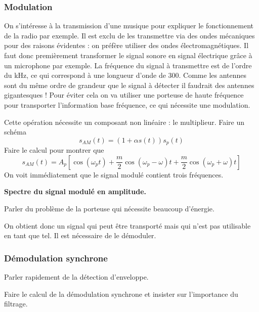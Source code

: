 \subsubsection{Modulation}

On s'intéresse à la transmission d'une musique pour expliquer le fonctionnement de la radio par exemple.
Il est exclu de les transmettre via des ondes mécaniques pour des raisons évidentes : on préfère utiliser des ondes électromagnétiques.
Il faut donc premièrement transformer le signal sonore en signal électrique grâce à un microphone par exemple.
La fréquence du signal à transmettre est de l'ordre du kHz, ce qui correspond à une longueur d'onde de \unit{300}{\kilo\meter}.
Comme les antennes sont du même ordre de grandeur que le signal à détecter il faudrait des antennes gigantesques !
Pour éviter cela on va utiliser une porteuse de haute fréquence pour transporter l'information base fréquence, ce qui nécessite une modulation.

Cette opération nécessite un composant non linéaire : le multiplieur.
Faire un schéma
\begin{equation}
s_{AM}(t) = (1+\alpha s(t))s_p(t)
\end{equation}
Faire le calcul pour montrer que 
\begin{equation}
s_{AM}(t) = A_p \left[ \cos(\omega_p t) + \frac{m}{2}\cos(\omega_p-\omega)t + \frac{m}{2}\cos(\omega_p+\omega)t \right] 
\end{equation}
On voit immédiatement que le signal modulé contient trois fréquences.

\begin{slide}
\textbf{Spectre du signal modulé en amplitude.}
\end{slide}

Parler du problème de la porteuse qui nécessite beaucoup d'énergie.

\begin{transition}
On obtient donc un signal qui peut être transporté mais qui n'est pas utilisable en tant que tel.
Il est nécessaire de le démoduler.
\end{transition}

\subsubsection{Démodulation synchrone}

Parler rapidement de la détection d'enveloppe.

Faire le calcul de la démodulation synchrone et insister sur l'importance du filtrage.
 
